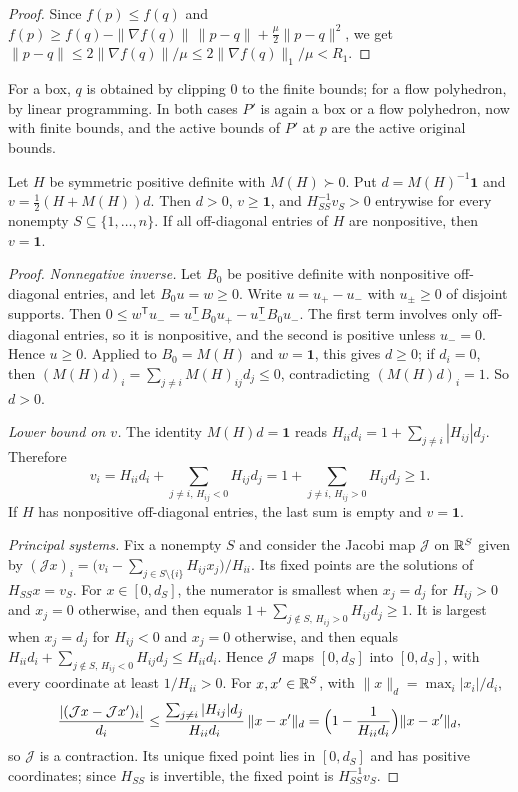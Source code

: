 \begin{proof}
Since $f(p)\le f(q)$ and
$f(p)\ge f(q)-\|\nabla f(q)\|\,\|p-q\|+\frac\mu2\|p-q\|^2$, we get
$\|p-q\|\le2\|\nabla f(q)\|/\mu\le2\|\nabla f(q)\|_1/\mu<R_1$.
\end{proof}

For a box, $q$ is obtained by clipping $0$ to the finite bounds; for a flow
polyhedron, by linear programming. In both cases $P'$ is again a box or a flow
polyhedron, now with finite bounds, and the active bounds of $P'$ at $p$ are
the active original bounds.

\begin{lemma}
\label{lem:constraints-admissible}
Let $H$ be symmetric positive definite with $M(H)\succ0$. Put
$d=M(H)^{-1}\mathbf 1$ and $v=\frac12(H+M(H))d$. Then $d>0$, $v\ge\mathbf 1$,
and $H_{SS}^{-1}v_S>0$ entrywise for every nonempty $S\subseteq\{1,\ldots,n\}$.
If all off-diagonal entries of $H$ are nonpositive, then $v=\mathbf 1$.
\end{lemma}

\begin{proof}
\emph{Nonnegative inverse.} Let $B_0$ be positive definite with nonpositive
off-diagonal entries, and let $B_0u=w\ge0$. Write $u=u_+-u_-$ with
$u_\pm\ge0$ of disjoint supports. Then
$0\le w^{\mathsf T}u_-=u_-^{\mathsf T}B_0u_+-u_-^{\mathsf T}B_0u_-$. The first
term involves only off-diagonal entries, so it is nonpositive, and the second is
positive unless $u_-=0$. Hence $u\ge0$. Applied to $B_0=M(H)$ and $w=\mathbf 1$,
this gives $d\ge0$; if $d_i=0$, then $(M(H)d)_i=\sum_{j\ne i}M(H)_{ij}d_j\le0$,
contradicting $(M(H)d)_i=1$. So $d>0$.

\emph{Lower bound on $v$.} The identity $M(H)d=\mathbf 1$ reads
$H_{ii}d_i=1+\sum_{j\ne i}|H_{ij}|d_j$. Therefore
\[
 v_i=H_{ii}d_i+\sum_{j\ne i,\,H_{ij}<0}H_{ij}d_j
    =1+\sum_{j\ne i,\,H_{ij}>0}H_{ij}d_j\ge1 .
\]
If $H$ has nonpositive off-diagonal entries, the last sum is empty and
$v=\mathbf 1$.

\emph{Principal systems.} Fix a nonempty $S$ and consider the Jacobi map
$\mathcal J$ on $\mathbb R^S$ given by
$(\mathcal Jx)_i=\bigl(v_i-\sum_{j\in S\setminus\{i\}}H_{ij}x_j\bigr)/H_{ii}$.
Its fixed points are the solutions of $H_{SS}x=v_S$. For $x\in[0,d_S]$, the
numerator is smallest when $x_j=d_j$ for $H_{ij}>0$ and $x_j=0$ otherwise,
and then equals $1+\sum_{j\notin S,\,H_{ij}>0}H_{ij}d_j\ge1$. It is largest
when $x_j=d_j$ for $H_{ij}<0$ and $x_j=0$ otherwise, and then equals
$H_{ii}d_i+\sum_{j\notin S,\,H_{ij}<0}H_{ij}d_j\le H_{ii}d_i$. Hence
$\mathcal J$ maps $[0,d_S]$ into $[0,d_S]$, with every coordinate at least
$1/H_{ii}>0$. For $x,x'\in\mathbb R^S$, with $\|x\|_d=\max_i|x_i|/d_i$,
\[
 \frac{|(\mathcal Jx-\mathcal Jx')_i|}{d_i}
 \le\frac{\sum_{j\ne i}|H_{ij}|d_j}{H_{ii}d_i}\,\|x-x'\|_d
 =\Bigl(1-\frac1{H_{ii}d_i}\Bigr)\|x-x'\|_d ,
\]
so $\mathcal J$ is a contraction. Its unique fixed point lies in $[0,d_S]$ and
has positive coordinates; since $H_{SS}$ is invertible, the fixed point is
$H_{SS}^{-1}v_S$.
\end{proof}

